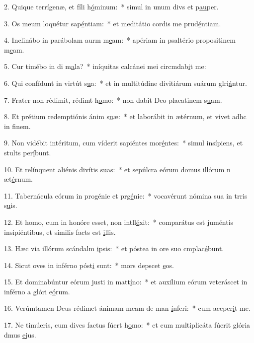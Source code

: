 2. Quique terrígenæ, et fíli h\uline{ó}minum:~* simul in unum divs et p\uline{au}per.\par 
3. Os meum loquétur sap\uline{é}ntiam:~* et meditátio cordis me prud\uline{é}ntiam.\par 
4. Inclinábo in parábolam aurm m\uline{e}am:~* apériam in psaltério propositinem m\uline{e}am.\par 
5. Cur timébo in di m\uline{a}la?~* iníquitas calcánei mei circmdab\uline{i}t me:\par 
6. Qui confídunt in virtút s\uline{u}a:~* et in multitúdine divitiárum suárum glri\uline{á}ntur.\par 
7. Frater non rédimit, rédimt h\uline{o}mo:~* non dabit Deo placatinem s\uline{u}am.\par 
8. Et prétium redemptiónis ánim s\uline{u}æ:~* et laborábit in ætérnum, et vivet adhc in f\uline{i}nem.\par 
9. Non vidébit intéritum, cum víderit sapiéntes mor\uline{é}ntes:~* simul insípiens, et stults per\uline{í}bunt.\par 
10. Et relínquent aliénis divítis s\uline{u}as:~* et sepúlcra eórum domus illórum n æt\uline{é}rnum.\par 
11. Tabernácula eórum in progénie et prg\uline{é}nie:~* vocavérunt nómina sua in trris s\uline{u}is.\par 
12. Et homo, cum in honóre esset, non intll\uline{é}xit:~* comparátus est juméntis insipiéntibus, et símilis facts est \uline{i}llis.\par 
13. Hæc via illórum scándalm \uline{i}psis:~* et póstea in ore suo cmplac\uline{é}bunt.\par 
14. Sicut oves in inférno póst\uline{i} sunt:~* mors depscet \uline{e}os.\par 
15. Et dominabúntur eórum justi in matt\uline{í}no:~* et auxílium eórum veteráscet in inférno a glóri e\uline{ó}rum.\par 
16. Verúmtamen Deus rédimet ánimam meam de man \uline{í}nferi:~* cum accper\uline{i}t me.\par 
17. Ne timúeris, cum dives factus fúert h\uline{o}mo:~* et cum multiplicáta fúerit glória dmus \uline{e}jus.\par 
